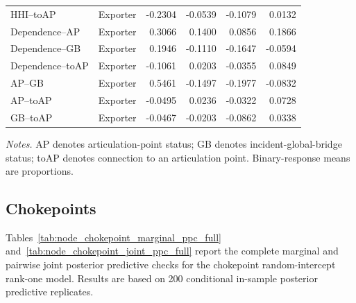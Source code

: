 \documentclass[pdftex,12pt,openright,a4paper,oneside]{book}
\begin{document}
\begin{longtable}{llrrrr}
HHI--toAP & Exporter & -0.2304 & -0.0539 & -0.1079 & 0.0132 \\
Dependence--AP & Exporter & 0.3066 & 0.1400 & 0.0856 & 0.1866 \\
Dependence--GB & Exporter & 0.1946 & -0.1110 & -0.1647 & -0.0594 \\
Dependence--toAP & Exporter & -0.1061 & 0.0203 & -0.0355 & 0.0849 \\
AP--GB & Exporter & 0.5461 & -0.1497 & -0.1977 & -0.0832 \\
AP--toAP & Exporter & -0.0495 & 0.0236 & -0.0322 & 0.0728 \\
GB--toAP & Exporter & -0.0467 & -0.0203 & -0.0862 & 0.0338 \\
\end{longtable}
\endgroup
\noindent\textit{Notes.} AP denotes articulation-point status; GB denotes incident-global-bridge status; toAP denotes connection to an articulation point. Binary-response means are proportions. 

\subsection{Chokepoints}
\label{app:node_intercept_chokepoints}

Tables~\ref{tab:node_chokepoint_marginal_ppc_full} and~\ref{tab:node_chokepoint_joint_ppc_full} 
report the complete marginal and pairwise joint posterior predictive checks for the chokepoint random-intercept rank-one model. Results are based on 200 conditional in-sample posterior predictive replicates.
\end{document}
